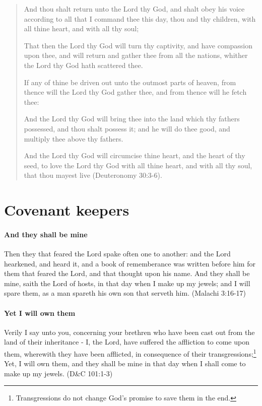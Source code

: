 \begin{quotation}
And thou shalt return unto the Lord thy God, and shalt obey his voice according to all that I command thee this day, thou and thy children, with all thine heart, and with all thy soul;

That then the Lord thy God will turn thy captivity, and have compassion upon thee, and will return and gather thee from all the nations, whither the Lord thy God hath scattered thee. 

If any of thine be driven out unto the outmost parts of heaven, from thence will the Lord thy God gather thee, and from thence will he fetch thee:

And the Lord thy God will bring thee into the land which thy fathers possessed, and thou shalt possess it; and he will do thee good, and multiply thee above thy fathers.

And the Lord thy God will circumcise thine heart, and the heart of thy seed, to love the Lord thy God with all thine heart, and with all thy soul, that thou mayest live (Deuteronomy 30:3-6).
\end{quotation}


\section{Covenant keepers}

\paragraph{And they shall be mine}
Then they that feared the Lord spake often one to another: and the Lord hearkened, and heard it, and a book of rememberance was written before him for them that feared the Lord, and that thought upon his name. And they shall be mine, saith the Lord of hosts, in that day when I make up my jewels; and I will spare them, as a man spareth his own son that serveth him. (Malachi 3:16-17)

\paragraph{Yet I will own them}
Verily I say unto you, concerning your brethren who have been cast out from the land of their inheritance - I, the Lord, have suffered the affliction to come upon them, wherewith they have been afflicted, in consequence of their transgressions;\footnote{Transgressions do not change God's promise to save them in the end.} Yet, I will own them, and they shall be mine in that day when I shall come to make up my jewels. (D\&C 101:1-3)

